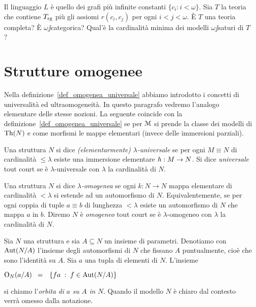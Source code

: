\begin{exercise}
Il linguaggio $L$ \`e quello dei grafi pi\`u infinite constanti $\{c_i:i<\omega\}$. Sia $T$ la teoria che contiene $T_{\rm rg}$ pi\`u gli assiomi $r(c_i, c_j)$ per ogni $i< j<\omega$. \`E $T$ una teoria completa? \`E $\omega\jj$categorica? Qual'\`e la cardinalit\`a minima dei modelli $\omega\jj$saturi di $T$?\QED 
\end{exercise}



\section{Strutture omogenee}
Nella definizione~\ref{def_omogenea_universale} abbiamo introdotto i concetti di universalit\`a ed ultraomogeneit\`a. In questo paragrafo vedremo l'analogo elementare delle stesse nozioni. La seguente coincide con la definizione~\ref{def_omogenea_universale} se per $\EuScript M$ si prende la classe dei modelli di $\textrm{Th}(N)$ e come morfismi le mappe elementari (invece delle immersioni parziali). 

\begin{definition}
Una struttura $N$ si dice \emph{(elementarmente) $\lambda$-universale\/} se per ogni $M\equiv N$ di cardinalit\`a $\le\lambda$ esiste una immersione elementare $h:M\rightarrow N$. Si dice \emph{universale\/} tout court se \`e $\lambda$-universale con $\lambda$ la cardinalit\`a di $N$. 

Una struttura $N$ si dice \emph{$\lambda$-omogenea\/} se ogni $k:N\to N$ mappa elementare di cardinalit\`a $<\lambda$ si estende ad un automorfismo di $N$. Equivalentemente, se per ogni coppia di tuple $a\equiv b$ di lunghezza $<\lambda$ esiste un automorfismo di $N$ che mappa $a$ in $b$. Diremo $N$ \`e \emph{omogeneo\/} tout court se \`e $\lambda$-omogeneo con $\lambda$ la cardinalit\`a di $N$.
\end{definition}

Sia $N$ una struttura e sia $A\subseteq N$ un insieme di parametri. Denotiamo con \emph{$\textrm{Aut}(N/A)$\/} l'insieme degli automorfismi di $N$ che fissano $A$ puntualmente, cio\`e che sono l'identit\`a su $A$. Sia $a$ una tupla di elementi di $N$. L'insieme

\hfil\emph{$\textrm{O}_N(a/A)$}$\ \ =\ \ \{fa\;:\; f\in\textrm{Aut}(N/A)\}$

si chiamo l'\emph{orbita di $a$ su $A$ in $N$}. Quando il modello $N$ \`e chiaro dal contesto verr\`a omesso dalla notazione. 

